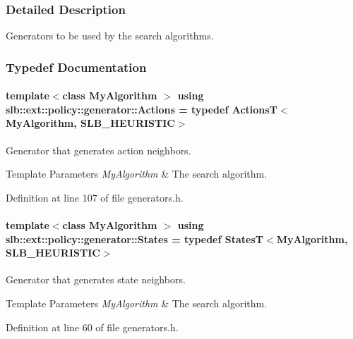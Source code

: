 \subsubsection{Detailed Description}
Generators to be used by the search algorithms. 

\subsubsection{Typedef Documentation}
\paragraph[{\texorpdfstring{Actions}{Actions}}]{\setlength{\rightskip}{0pt plus 5cm}template$<$class My\+Algorithm $>$ using {\bf slb\+::ext\+::policy\+::generator\+::\+Actions} = typedef {\bf ActionsT}$<$My\+Algorithm, S\+L\+B\+\_\+\+H\+E\+U\+R\+I\+S\+T\+IC$>$}\hypertarget{namespaceslb_1_1ext_1_1policy_1_1generator_aa810b71d654db732e5433be0f4baf4fa}{}\label{namespaceslb_1_1ext_1_1policy_1_1generator_aa810b71d654db732e5433be0f4baf4fa}


Generator that generates action neighbors. 


\begin{DoxyTemplParams}{Template Parameters}
{\em My\+Algorithm} & The search algorithm. \\
\hline
\end{DoxyTemplParams}


Definition at line 107 of file generators.\+h.

\paragraph[{\texorpdfstring{States}{States}}]{\setlength{\rightskip}{0pt plus 5cm}template$<$class My\+Algorithm $>$ using {\bf slb\+::ext\+::policy\+::generator\+::\+States} = typedef {\bf StatesT}$<$My\+Algorithm, S\+L\+B\+\_\+\+H\+E\+U\+R\+I\+S\+T\+IC$>$}\hypertarget{namespaceslb_1_1ext_1_1policy_1_1generator_a712500d6a77d98fdbc9baace652dc5ee}{}\label{namespaceslb_1_1ext_1_1policy_1_1generator_a712500d6a77d98fdbc9baace652dc5ee}


Generator that generates state neighbors. 


\begin{DoxyTemplParams}{Template Parameters}
{\em My\+Algorithm} & The search algorithm. \\
\hline
\end{DoxyTemplParams}


Definition at line 60 of file generators.\+h.

